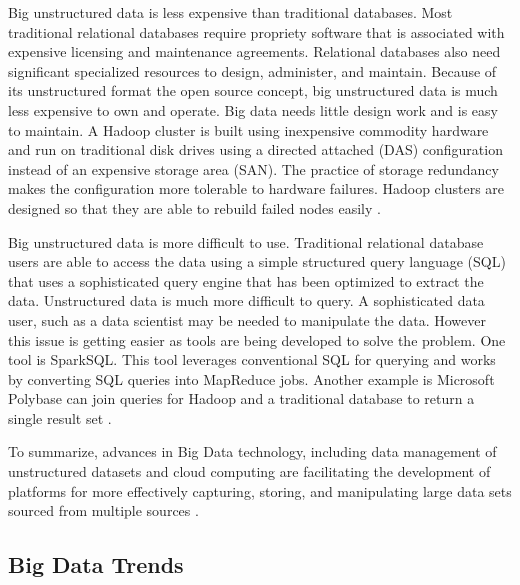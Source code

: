 \documentclass[sigconf]{acmart}
\begin{document}
Big unstructured data is less expensive than traditional databases. Most traditional relational databases require propriety software that is associated with expensive licensing and maintenance agreements.  Relational databases also need significant specialized resources to design, administer, and maintain. Because of its unstructured format the open source concept, big unstructured data is much less expensive to own and operate. Big data needs little design work and is easy to maintain. A Hadoop cluster is built using inexpensive commodity hardware and run on traditional disk drives using a directed attached (DAS) configuration instead of an expensive storage area (SAN).  The practice of storage redundancy makes the configuration more tolerable to hardware failures.  Hadoop clusters are designed so that they are able to rebuild failed nodes easily \cite{www-google-HlthCat}.  

Big unstructured data is more difficult to use.  Traditional relational database users are able to access the data using a simple structured query language (SQL) that uses a sophisticated query engine that has been optimized to extract the data.  Unstructured data is much more difficult to query. A sophisticated data user, such as a data scientist may be needed to manipulate the data. However this issue is getting easier as tools are being developed to solve the problem. One tool is SparkSQL.  This tool leverages conventional SQL for querying and works by converting SQL queries into MapReduce jobs.  Another example is Microsoft Polybase can join queries for Hadoop and a traditional database to return a single result set \cite{www-google-HlthCat}. 

To summarize, advances in Big Data technology, including data management of unstructured datasets and cloud computing are facilitating the development of platforms for more effectively capturing, storing, and manipulating large data sets sourced from multiple sources \cite{springer}.  

\subsection{Big Data Trends}
\end{document}
